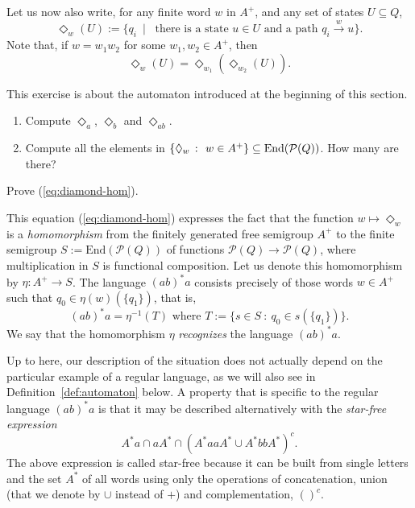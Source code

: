 Let us now also write, for any finite word $w$ in $A^+$, and any set of states $U \subseteq Q$,
\[ \Diamond_w(U) := \{ q_i \ \mid \ \text{ there is a state } u \in U \text{ and a path } q_i \stackrel{w}{\to} u \}.\]
Note that, if $w = w_1w_2$ for some $w_1, w_2 \in A^+$, then
\begin{equation}\label{eq:diamond-hom}
\Diamond_w(U) = \Diamond_{w_1} (\Diamond_{w_2}(U)).
\end{equation}

\begin{exercise}\label{exe:diamond}
  This exercise is about the automaton introduced at the beginning of this section.
  \begin{enumerate}
\item \easy Compute $\Diamond_a$, $\Diamond_b$ and $\Diamond_{ab}$.
\item \medium Compute all the elements in $\{ \Diamond_w \ \colon \ w \in A^+\} \subseteq \mathrm{End}(\mathcal{P}(Q))$. How many are there?
  \end{enumerate}
\end{exercise}
\begin{exercise}\easy
 Prove (\ref{eq:diamond-hom}).
\end{exercise}

This equation (\ref{eq:diamond-hom}) expresses the fact that the function $w \mapsto \Diamond_w$ is a \emph{homomorphism} from the finitely generated free semigroup $A^+$ to the finite semigroup $S := \mathrm{End}(\mathcal{P}(Q))$ of functions $\mathcal{P}(Q) \to \mathcal{P}(Q)$, where multiplication in $S$ is functional composition. Let us denote this homomorphism by $\eta \colon A^+ \to S$. The language $(ab)^*a$ consists precisely of those words $w \in A^+$ such that $q_0 \in \eta(w)(\{q_1\})$, that is,
\[ (ab)^*a = \eta^{-1}(T) \text{ where } T := \{s \in S \ \colon \ q_0 \in s(\{q_1\})\}.\]
We say that the homomorphism $\eta$ \emph{recognizes} the language $(ab)^*a$. 

Up to here, our description of the situation does not actually  depend on the particular example of a regular language, as we will also see in Definition~\ref{def:automaton} below. A property that is specific to the regular language $(ab)^*a$ is that it may be described alternatively with the \emph{star-free expression}
\[  A^*a \cap aA^* \cap (A^*aaA^* \cup A^*bbA^*)^c.\]
The above expression is called star-free because it can be built from  single letters and the set $A^*$ of all words using only the operations of concatenation, union (that we denote by $\cup$ instead of $+$) and complementation, $()^c$.
%

